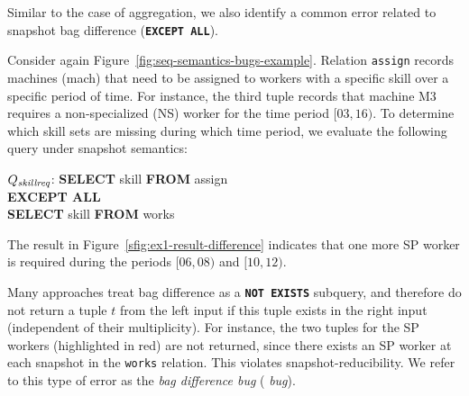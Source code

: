 Similar to the case of  aggregation, we also identify a
common error related to snapshot bag difference
(\texttt{\textbf{EXCEPT ALL}}).

\begin{exam}\label{ex:bag-difference-running-example}
  Consider again Figure~\ref{fig:seq-semantics-bugs-example}. Relation
  \texttt{assign} records machines (mach) that need to be assigned to
  workers with a specific skill over a specific period of time. For
  instance, the third tuple records that machine M3 requires a
  non-specialized (NS) worker for the time period $[03, 16)$.  To
  determine which skill sets are missing during which time period, we
  evaluate the following query under snapshot semantics:
  \begin{tt}
    \begin{tabbing}
      $Q_\mathit{skillreq}$:
      \=\textbf{SELECT} skill \textbf{FROM} assign\\
      \>\textbf{EXCEPT ALL}\\
      \>\textbf{SELECT} skill \textbf{FROM} works
    \end{tabbing}
  \end{tt}
  The result in Figure~\ref{sfig:ex1-result-difference} indicates that
  one more SP worker is required during the periods
  $[06,08)$ and $[10, 12)$. %
\end{exam}

Many approaches treat bag difference as a
\texttt{\textbf{NOT EXISTS}} subquery, and therefore do not return a
tuple $t$ from the left input if this tuple exists in the
right input (independent of their multiplicity).  For instance, the
two tuples for the SP workers (highlighted in red) are not
returned, since there exists an SP worker at each snapshot in the
\texttt{works} relation.  This violates snapshot-reducibility.  We
refer to this type of error as the \emph{bag difference bug}
(\emph{\abbrBDB{} bug}).

